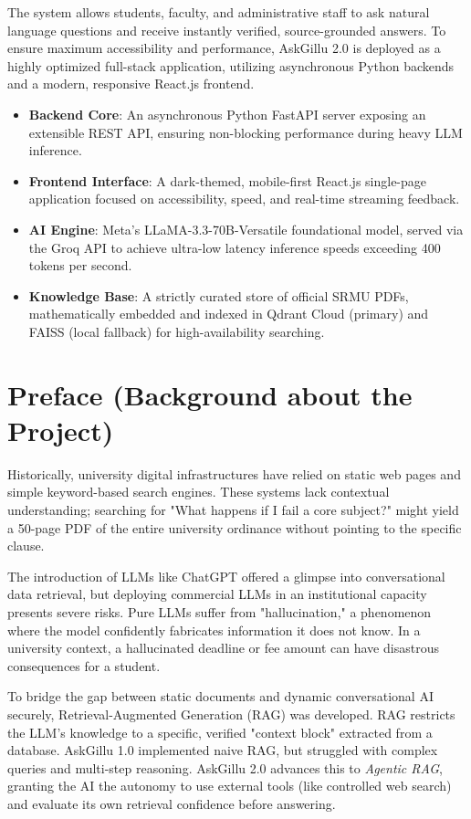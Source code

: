 \documentclass[12pt,a4paper]{report}
\begin{document}
The system allows students, faculty, and administrative staff to ask natural language questions and receive instantly verified, source-grounded answers. To ensure maximum accessibility and performance, AskGillu 2.0 is deployed as a highly optimized full-stack application, utilizing asynchronous Python backends and a modern, responsive React.js frontend.

\begin{itemize}
    \item \textbf{Backend Core}: An asynchronous Python FastAPI server exposing an extensible REST API, ensuring non-blocking performance during heavy LLM inference.
    \item \textbf{Frontend Interface}: A dark-themed, mobile-first React.js single-page application focused on accessibility, speed, and real-time streaming feedback.
    \item \textbf{AI Engine}: Meta's LLaMA-3.3-70B-Versatile foundational model, served via the Groq API to achieve ultra-low latency inference speeds exceeding 400 tokens per second.
    \item \textbf{Knowledge Base}: A strictly curated store of official SRMU PDFs, mathematically embedded and indexed in Qdrant Cloud (primary) and FAISS (local fallback) for high-availability searching.
\end{itemize}

\section{Preface (Background about the Project)}
Historically, university digital infrastructures have relied on static web pages and simple keyword-based search engines. These systems lack contextual understanding; searching for "What happens if I fail a core subject?" might yield a 50-page PDF of the entire university ordinance without pointing to the specific clause. 

The introduction of LLMs like ChatGPT offered a glimpse into conversational data retrieval, but deploying commercial LLMs in an institutional capacity presents severe risks. Pure LLMs suffer from "hallucination," a phenomenon where the model confidently fabricates information it does not know. In a university context, a hallucinated deadline or fee amount can have disastrous consequences for a student. 

To bridge the gap between static documents and dynamic conversational AI securely, Retrieval-Augmented Generation (RAG) was developed. RAG restricts the LLM's knowledge to a specific, verified "context block" extracted from a database. AskGillu 1.0 implemented naive RAG, but struggled with complex queries and multi-step reasoning. AskGillu 2.0 advances this to \textit{Agentic RAG}, granting the AI the autonomy to use external tools (like controlled web search) and evaluate its own retrieval confidence before answering.
\end{document}
